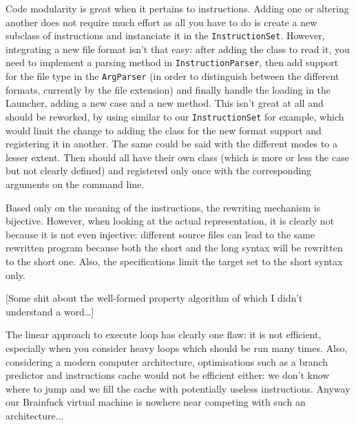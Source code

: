 \documentclass{article}
\begin{document}
Code modularity is great when it pertains to instructions. Adding one or altering another does not require much effort as all you have to do is create a new subclass of instructions and instanciate it in the \texttt{InstructionSet}. However, integrating a new file format isn't that easy: after adding the class to read it, you need to implement a parsing method in \texttt{InstructionParser}, then add support for the file type in the \texttt{ArgParser} (in order to distinguish between the different formats, currently by the file extension) and finally handle the loading in the Launcher, adding a new case and a new method. This isn't great at all and should be reworked, by using similar to our \texttt{InstructionSet} for example, which would limit the change to adding the class for the new format support and registering it in another. The same could be said with the different modes to a lesser extent. Then should all have their own class (which is more or less the case but not clearly defined) and registered only once with the corresponding arguments on the command line.

Based only on the meaning of the instructions, the rewriting mechanism is bijective. However, when looking at the actual representation, it is clearly not because it is not even injective: different source files can lead to the same rewritten program because both the short and the long syntax will be rewritten to the short one. Also, the specifications limit the target set to the short syntax only.

[Some shit about the well-formed property algorithm of which I didn't understand a word…]

The linear approach to execute loop has clearly one flaw: it is not efficient, especially when you consider heavy loops which should be run many times. Also, considering a modern computer architecture, optimisations such as a branch predictor and instructions cache would not be efficient either: we don't know where to jump and we fill the cache with potentially useless instructions. Anyway our Brainfuck virtual machine is nowhere near competing with such an architecture...
\end{document}
